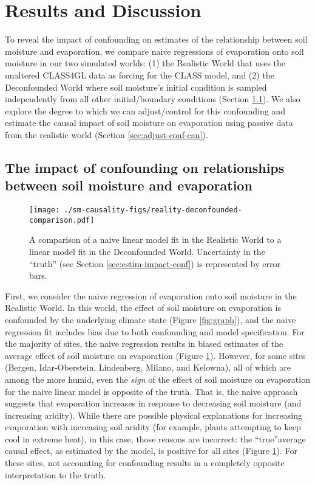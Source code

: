 \section{Results and Discussion}

To reveal the impact of confounding on estimates of the relationship
between soil moisture and evaporation, we compare naive regressions of
evaporation onto soil moisture in our two simulated worlds: (1) the
Realistic World that uses the unaltered CLASS4GL data as forcing for
the CLASS model, and (2) the Deconfounded World where soil moisture's
initial condition is sampled independently from all other
initial/boundary conditions (Section \ref{sec:impact-conf-relat}). We
also explore the degree to which we can adjust/control for this
confounding and estimate the causal impact of soil moisture on
evaporation using passive data from the realistic world (Section
\ref{sec:adjust-conf-can}).

\subsection{The impact of confounding on relationships between soil moisture and evaporation}
\label{sec:impact-conf-relat}

\begin{figure}
  \texttt{[image: ./sm-causality-figs/reality-deconfounded-comparison.pdf]}
  \caption{A comparison of a naive linear model fit in the Realistic
    World to a linear model fit in the Deconfounded World. Uncertainty
    in the ``truth'' (see Section \ref{sec:estim-impact-conf}) is
    represented by error bars.}
\label{fig:reality-deconfounded}
\end{figure}

First, we consider the naive regression of evaporation onto soil
moisture in the Realistic World. In this world, the effect of soil
moisture on evaporation is confounded by the underlying climate state
(Figure \ref{fig:graph}), and the naive regression fit includes bias
due to both confounding and model specification. For the majority of
sites, the naive regression results in biased estimates of the average
effect of soil moisture on evaporation (Figure
\ref{fig:reality-deconfounded}). However, for some sites (Bergen,
Idar-Oberstein, Lindenberg, Milano, and Kelowna), all of which are
among the more humid, even the \textit{sign} of the effect of soil
moisture on evaporation for the naive linear model is opposite of the
truth. That is, the naive approach suggests that evaporation increases
in response to decreasing soil moisture (and increasing
aridity). While there are possible physical explanations for
increasing evaporation with increasing soil aridity (for example,
plants attempting to keep cool in extreme heat\cite{krich2022}), in
this case, those reasons are incorrect: the ``true''average causal
effect, as estimated by the model, is positive for all sites (Figure
\ref{fig:reality-deconfounded}).  For these sites, not accounting for
confounding results in a completely opposite interpretation to the
truth.

